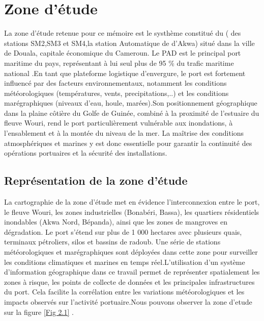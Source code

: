 \documentclass[a4paper,12pt,openany]{report}
\begin{document}
	\section{Zone d’étude}
	
	\quad La zone d’étude retenue pour ce mémoire est le systhème constitué du ( des stations SM2,SM3 et SM4,la station Automatique de d'Akwa) situé dans la ville de Douala, capitale économique du Cameroun. Le PAD est le principal port maritime du pays, représentant à lui seul plus de 95 \% du trafic maritime national\cite{PAD2023} .En tant que plateforme logistique d’envergure, le port est fortement influencé par des facteurs environnementaux, notamment les conditions météorologiques (températures, vents, precipitations,..) et les conditions marégraphiques (niveaux d’eau, houle, marées).Son positionnement géographique dans la plaine côtière du Golfe de Guinée, combiné à la proximité de l’estuaire du fleuve Wouri, rend le port particulièrement vulnérable aux inondations, à l’ensablement et à la montée du niveau de la mer\cite{MINEPDED2022}. La maîtrise des conditions atmosphériques et marines y est donc essentielle pour garantir la continuité des opérations portuaires et la sécurité des installations.

	


	
		\subsection{Représentation de la zone d’étude}
	
	\quad La cartographie de la zone d’étude met en évidence l’interconnexion entre le port, le fleuve Wouri, les zones industrielles (Bonabéri, Bassa), les quartiers résidentiels inondables (Akwa Nord, Bépanda), ainsi que les zones de mangroves en dégradation. Le port s’étend sur plus de 1 000 hectares avec plusieurs quais, terminaux pétroliers, silos et bassins de radoub. Une série de stations météorologiques et marégraphiques sont déployées dans cette zone pour surveiller les conditions climatiques et marines en temps réel.L’utilisation d’un système d’information géographique dans ce travail permet de représenter spatialement les zones à risque, les points de collecte de données et les principales infrastructures du port. Cela facilite la corrélation entre les variations météorologiques et les impacts observés sur l’activité portuaire.Nous pouvons observer la zone d'etude sur la figure \ref{Fig 2.1} .\\
	
\end{document}
